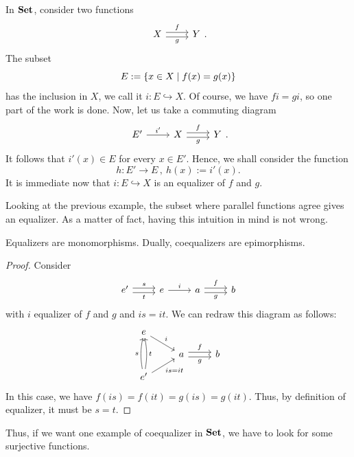 \begin{example}
  In \(\mathbf{Set}\), consider two functions
  \[\begin{tikzcd}
      X \ar["f", r, shift left] \ar["g", r, shift right, swap] & Y
    \end{tikzcd} .\] The subset
  \[E := \left\{x \in X \mid f(x) = g(x)\right\}\] has the inclusion in \(X\), we
  call it \(i : E \hookrightarrow X\). Of course, we have \(fi = gi\), so one part
  of the work is done. Now, let us take a commuting diagram
  \[\begin{tikzcd}
      E' \ar["{i'}", r] & X \ar["f", r, shift left] \ar["g", r, shift
      right, swap] & Y
    \end{tikzcd} .\] It follows that \(i'(x) \in E\) for every
  \(x \in E'\). Hence, we shall consider the function
  \[h : E' \to E\,, \ h(x) := i'(x) .\] It is immediate now that
  \(i : E \hookrightarrow X\) is an equalizer of \(f\) and \(g\).
\end{example}

Looking at the previous example, the subset where parallel functions
agree gives an equalizer. As a matter of fact, having this intuition in
mind is not wrong.

\begin{lemma}\label{lemma:EqualizersAreMonos}
  Equalizers are monomorphisms. Dually, coequalizers are epimorphisms.
\end{lemma}

\begin{proof}
  Consider
  \[\begin{tikzcd}
      e' \ar["s", r, shift left] \ar["t", r, shift right, swap] & e
      \ar["i", r] & a \ar["f", r, shift left] \ar["g", r, shift right,
      swap] & b
    \end{tikzcd}\] with \(i\) equalizer of \(f\) and \(g\) and
  \(is = it\). We can redraw this diagram as follows:
  \[\begin{tikzcd}[row sep=small]
      e \ar["i", dr] \\
      & a \ar["f", r, shift left] \ar["g", r, shift right, swap] & b \\
      e' \ar["s", uu, bend left=10] \ar["t", uu, bend right=10, swap]
      \ar["{is = it}", ur, swap]
    \end{tikzcd}\] In this case, we have
  \(f(is) = f(it) = g(is) = g(it)\). Thus, by definition of equalizer,
  it must be \(s = t\).
\end{proof}

Thus, if we want one example of coequalizer in \(\mathbf{Set}\), we have to look for
some surjective functions.

